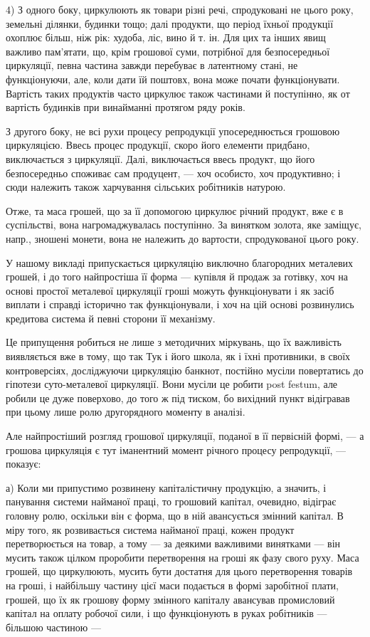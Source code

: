 4) З одного боку, циркулюють як товари різні речі, спродуковані
не цього року, земельні ділянки, будинки тощо; далі продукти, що
період їхньої продукції охоплює більш, ніж рік: худоба, ліс, вино й т. ін.
Для цих та інших явищ важливо пам’ятати, що, крім грошової суми,
потрібної для безпосередньої циркуляції, певна частина завжди перебуває
в латентному стані, не функціонуючи, але, коли дати їй поштовх, вона
може почати функціонувати. Вартість таких продуктів часто циркулює
також частинами й поступінно, як от вартість будинків при винайманні
протягом ряду років.

З другого боку, не всі рухи процесу репродукції упосереднюється
грошовою циркуляцією. Ввесь процес продукції, скоро його елементи
придбано, виключається з циркуляції. Далі, виключається ввесь продукт,
що його безпосередньо споживає сам продуцент, — хоч особисто, хоч
продуктивно; і сюди належить також харчування сільських робітників
натурою.

Отже, та маса грошей, що за її допомогою циркулює річний продукт,
вже є в суспільстві, вона нагромаджувалась поступінно. За винятком золота,
яке заміщує, напр., зношені монети, вона не належить до вартости,
спродукованої цього року.

У нашому викладі припускається циркуляцію виключно благородних
металевих грошей, і до того найпростіша її форма — купівля й продаж
за готівку, хоч на основі простої металевої циркуляції гроші можуть
функціонувати і як засіб виплати і справді історично так функціонували,
і хоч на цій основі розвинулись кредитова система й певні сторони
її механізму.

Це припущення робиться не лише з методичних міркувань, що їх важливість
виявляється вже в тому, що так Тук і його школа, як і їхні противники,
в своїх контроверсіях, досліджуючи циркуляцію банкнот, постійно
мусіли повертатись до гіпотези суто-металевої циркуляції. Вони мусіли
це робити post festum, але робили це дуже поверхово, до того ж під
тиском, бо вихідний пункт відігравав при цьому лише ролю другорядного
моменту в аналізі.

Але найпростіший розгляд грошової циркуляції, поданої в її первісній
формі, — а грошова циркуляція є тут іманентний момент річного процесу
репродукції, — показує:

а) Коли ми припустимо розвинену капіталістичну продукцію, а значить,
і панування системи найманої праці, то грошовий капітал, очевидно,
відіграє головну ролю, оскільки він є форма, що в ній авансується
змінний капітал. В міру того, як розвивається система найманої праці,
кожен продукт перетворюється на товар, а тому — за деякими важливими
винятками — він мусить також цілком проробити перетворення на
гроші як фазу свого руху. Маса грошей, що циркулюють, мусить бути
достатня для цього перетворення товарів на гроші, і найбільшу частину
цієї маси подається в формі заробітної плати, грошей, що їх як грошову
форму змінного капіталу авансував промисловий капітал на оплату робочої
сили, і що функціонують в руках робітників — більшою частиною —
\parbreak{}  %
